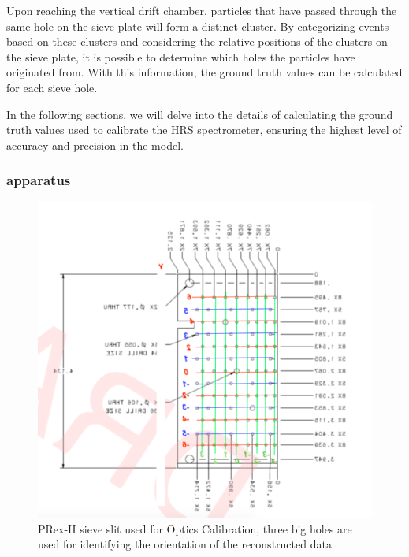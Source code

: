 Upon reaching the vertical drift chamber, particles that have passed through the same hole on the sieve plate will form a distinct cluster. By categorizing events based on these clusters and considering the relative positions of the clusters on the sieve plate, it is possible to determine which holes the particles have originated from. With this information, the ground truth values can be calculated for each sieve hole.

In the following sections, we will delve into the details of calculating the ground truth values used to calibrate the HRS spectrometer, ensuring the highest level of accuracy and precision in the model.

\subsubsection{apparatus}

\begin{figure}
    \centering
    \includegraphics[width =\textwidth]{images/chap4/sieve_cnc_draw.png}
    \caption{PRex-II sieve slit used for Optics Calibration, three big holes are used for identifying the orientation of the reconstructed data}
    \label{fig:sieve_cnc_draw}
\end{figure}


